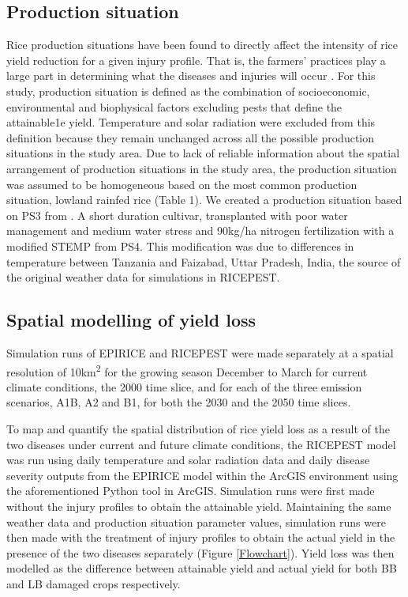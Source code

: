 \documentclass[preprint,review,12pt]{elsarticle}
\begin{document}
    \subsection{Production situation}
    Rice production situations have been found to directly affect the intensity of rice yield reduction for a given injury profile. That is, the farmers' practices play a large part in determining what the diseases and injuries will occur \cite{Savary2000}. For this study, production situation is defined as the combination of socioeconomic, environmental and biophysical factors excluding pests that define the attainable1e yield. Temperature and solar radiation were excluded from this definition because they remain unchanged across all the possible production situations in the study area. Due to lack of reliable information about the spatial arrangement of production situations in the study area, the production situation was assumed to be homogeneous based on the most common production situation, lowland rainfed rice \cite{Diagne2013} (Table 1). We created a production situation based on PS3 from \citet{Willocquet2004}. A short duration cultivar, transplanted with poor water management and medium water stress and 90kg/ha nitrogen fertilization with a modified STEMP from PS4. This modification was due to differences in temperature between Tanzania and Faizabad, Uttar Pradesh, India, the source of the original weather data for simulations in RICEPEST.
    
    \subsection{Spatial modelling of yield loss}
    Simulation runs of EPIRICE and RICEPEST were made separately at a spatial resolution of 10km\textsuperscript{2} for the growing season December to March for current climate conditions, the 2000 time slice, and for each of the three emission scenarios, A1B, A2 and B1, for both the 2030 and the 2050 time slices.
    
    To map and quantify the spatial distribution of rice yield loss as a result of the two diseases under current and future climate conditions, the RICEPEST model was run using daily temperature and solar radiation data and daily disease severity outputs from the EPIRICE model within the ArcGIS environment using the aforementioned Python tool in ArcGIS. Simulation runs were first made without the injury profiles to obtain the attainable yield. Maintaining the same weather data and production situation parameter values, simulation runs were then made with the treatment of injury profiles to obtain the actual yield in the presence of the two diseases separately (Figure \ref{Flowchart}). Yield loss was then modelled as the difference between attainable yield and actual yield for both BB and LB damaged crops respectively.
    
\end{document}
